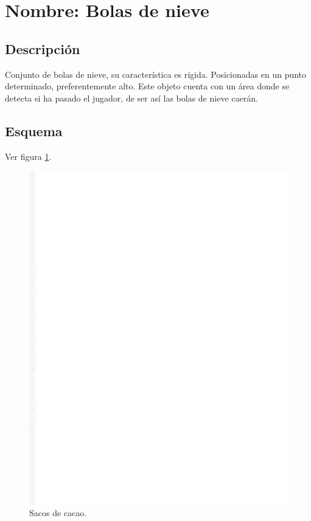 		\section{Nombre: Bolas de nieve}\label{obs.bolasN}
	\subsection{Descripción}
	Conjunto de bolas de nieve, su característica es rígida. Posicionadas en un punto determinado, preferentemente alto. Este objeto cuenta con un área donde se detecta si ha pasado el jugador, de ser así las bolas de nieve caerán.
	\subsection{Esquema}
	Ver figura \ref{fig:bolasN}.
	\begin{figure}
		\centering
		\includegraphics[height=0.2 \textheight]{Imagenes/bolasN}
		\caption{Sacos de cacao.}
		\label{fig:bolasN}
	\end{figure}
